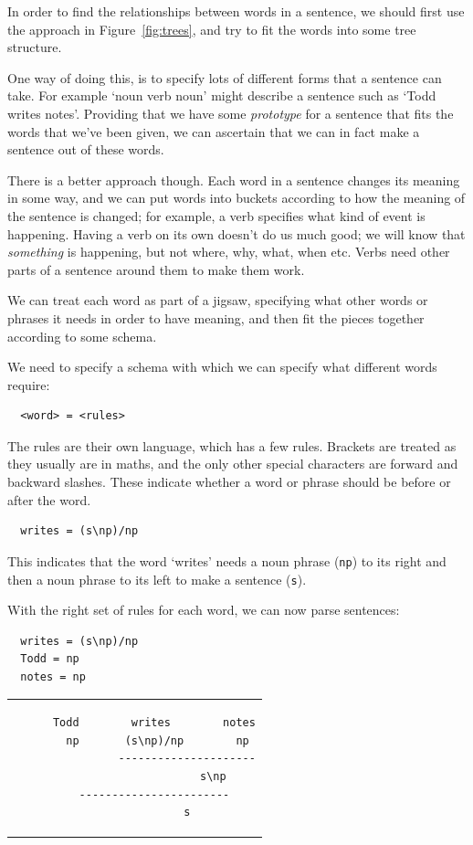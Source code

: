 In order to find the relationships between words in a sentence, we should first
use the approach in Figure~\ref{fig:trees}, and try to fit the words into some
tree structure.

One way of doing this, is to specify lots of different forms that a sentence can
take. For example `noun verb noun' might describe a sentence such as `Todd
writes notes'. Providing that we have some \textit{prototype} for a sentence
that fits the words that we've been given, we can ascertain that we can in fact
make a sentence out of these words.

There is a better approach though. Each word in a sentence changes its meaning
in some way, and we can put words into buckets according to how the meaning of
the sentence is changed; for example, a verb specifies what kind of event is
happening. Having a verb on its own doesn't do us much good; we will know that
\textit{something} is happening, but not where, why, what, when etc. Verbs need
other parts of a sentence around them to make them work.

We can treat each word as part of a jigsaw, specifying what other words or
phrases it needs in order to have meaning, and then fit the pieces together
according to some schema.

We need to specify a schema with which we can specify what different words require:

\begin{verbatim}
  <word> = <rules>
\end{verbatim}

The rules are their own language, which has a few rules. Brackets are treated as
they usually are in maths, and the only other special characters are forward and
backward slashes. These indicate whether a word or phrase should be before or
after the word.

\begin{verbatim}
  writes = (s\np)/np
\end{verbatim}

This indicates that the word `writes' needs a noun phrase (\texttt{np}) to its
right and then a noun phrase to its left to make a sentence (\texttt{s}).

With the right set of rules for each word, we can now parse sentences:

\begin{verbatim}
  writes = (s\np)/np
  Todd = np
  notes = np
\end{verbatim}

\begin{center}
  \begin{tabular}{c}
    \begin{lstlisting}
      Todd        writes        notes
       np       (s\np)/np        np
                ---------------------
                        s\np
      -----------------------
                s
    \end{lstlisting}
  \end{tabular}
\end{center}

